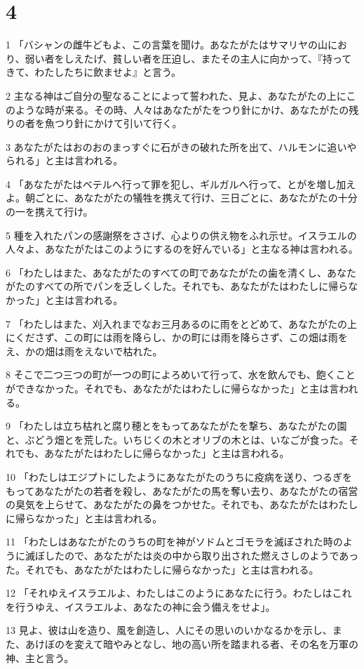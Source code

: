 \chapter{4}

\par 1 「バシャンの雌牛どもよ、この言葉を聞け。あなたがたはサマリヤの山におり、弱い者をしえたげ、貧しい者を圧迫し、またその主人に向かって、『持ってきて、わたしたちに飲ませよ』と言う。
\par 2 主なる神はご自分の聖なることによって誓われた、見よ、あなたがたの上にこのような時が来る。その時、人々はあなたがたをつり針にかけ、あなたがたの残りの者を魚つり針にかけて引いて行く。
\par 3 あなたがたはおのおのまっすぐに石がきの破れた所を出て、ハルモンに追いやられる」と主は言われる。
\par 4 「あなたがたはベテルへ行って罪を犯し、ギルガルへ行って、とがを増し加えよ。朝ごとに、あなたがたの犠牲を携えて行け、三日ごとに、あなたがたの十分の一を携えて行け。
\par 5 種を入れたパンの感謝祭をささげ、心よりの供え物をふれ示せ。イスラエルの人々よ、あなたがたはこのようにするのを好んでいる」と主なる神は言われる。
\par 6 「わたしはまた、あなたがたのすべての町であなたがたの歯を清くし、あなたがたのすべての所でパンを乏しくした。それでも、あなたがたはわたしに帰らなかった」と主は言われる。
\par 7 「わたしはまた、刈入れまでなお三月あるのに雨をとどめて、あなたがたの上にくださず、この町には雨を降らし、かの町には雨を降らさず、この畑は雨をえ、かの畑は雨をえないで枯れた。
\par 8 そこで二つ三つの町が一つの町によろめいて行って、水を飲んでも、飽くことができなかった。それでも、あなたがたはわたしに帰らなかった」と主は言われる。
\par 9 「わたしは立ち枯れと腐り穂とをもってあなたがたを撃ち、あなたがたの園と、ぶどう畑とを荒した。いちじくの木とオリブの木とは、いなごが食った。それでも、あなたがたはわたしに帰らなかった」と主は言われる。
\par 10 「わたしはエジプトにしたようにあなたがたのうちに疫病を送り、つるぎをもってあなたがたの若者を殺し、あなたがたの馬を奪い去り、あなたがたの宿営の臭気を上らせて、あなたがたの鼻をつかせた。それでも、あなたがたはわたしに帰らなかった」と主は言われる。
\par 11 「わたしはあなたがたのうちの町を神がソドムとゴモラを滅ぼされた時のように滅ぼしたので、あなたがたは炎の中から取り出された燃えさしのようであった。それでも、あなたがたはわたしに帰らなかった」と主は言われる。
\par 12 「それゆえイスラエルよ、わたしはこのようにあなたに行う。わたしはこれを行うゆえ、イスラエルよ、あなたの神に会う備えをせよ」。
\par 13 見よ、彼は山を造り、風を創造し、人にその思いのいかなるかを示し、また、あけぼのを変えて暗やみとなし、地の高い所を踏まれる者、その名を万軍の神、主と言う。

